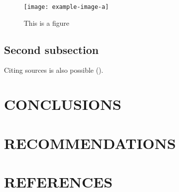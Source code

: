 \documentclass[titlepage, 12pt]{article}
\let\oldsection\section
\renewcommand\section[1]{\oldsection{\MakeUppercase{#1}}}
\begin{document}
\begin{figure}[ht!]
    \centering
    \texttt{[image: example-image-a]}
    \caption{This is a figure}
    \label{fig:firstfig}
\end{figure}

\subsection{Second subsection}

\lipsum

Citing sources is also possible (\cite{source}).

\section{Conclusions}

\lipsum

\section{Recommendations}

\lipsum

\newpage
\setcounter{secnumdepth}{0}  %
\section{References}

\printbibliography[heading=none]
\end{document}
